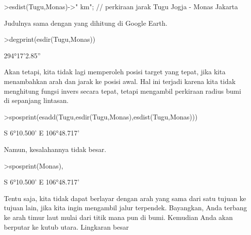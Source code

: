 \documentclass[a4paper,10pt]{article}
\begin{document}
\begin{eulernotebook}
\begin{eulercomment}
\begin{eulercomment}
\begin{eulercomment}
\begin{eulercomment}
\begin{eulercomment}
\begin{eulercomment}
\begin{eulercomment}
\begin{eulercomment}
\begin{eulercomment}
\begin{eulercomment}
\begin{eulercomment}
\begin{eulercomment}
\begin{eulercomment}
\begin{eulercomment}
\begin{eulercomment}
\begin{eulercomment}
\begin{eulercomment}
\begin{eulercomment}
\begin{eulercomment}
\begin{eulercomment}
\begin{eulercomment}
\begin{eulercomment}
\begin{eulercomment}
\begin{eulercomment}
\begin{eulercomment}
\begin{eulercomment}
\begin{eulercomment}
\begin{eulercomment}
\begin{eulercomment}
\begin{eulercomment}
\begin{eulerprompt}
>esdist(Tugu,Monas)->" km"; // perkiraan jarak Tugu Jogja - Monas Jakarta
\end{eulerprompt}
\begin{eulercomment}
Judulnya sama dengan yang dihitung di Google Earth.
\end{eulercomment}
\begin{eulerprompt}
>degprint(esdir(Tugu,Monas))
\end{eulerprompt}
\begin{euleroutput}
  294°17'2.85''
\end{euleroutput}
\begin{eulercomment}
Akan tetapi, kita tidak lagi memperoleh posisi target yang tepat, jika
kita menambahkan arah dan jarak ke posisi awal. Hal ini terjadi karena
kita tidak menghitung fungsi invers secara tepat, tetapi mengambil
perkiraan radius bumi di sepanjang lintasan.
\end{eulercomment}
\begin{eulerprompt}
>sposprint(esadd(Tugu,esdir(Tugu,Monas),esdist(Tugu,Monas)))
\end{eulerprompt}
\begin{euleroutput}
  S 6°10.500' E 106°48.717'
\end{euleroutput}
\begin{eulercomment}
Namun, kesalahannya tidak besar.
\end{eulercomment}
\begin{eulerprompt}
>sposprint(Monas),
\end{eulerprompt}
\begin{euleroutput}
  S 6°10.500' E 106°48.717'
\end{euleroutput}
\begin{eulercomment}
Tentu saja, kita tidak dapat berlayar dengan arah yang sama dari satu
tujuan ke tujuan lain, jika kita ingin mengambil jalur terpendek.
Bayangkan, Anda terbang ke arah timur laut mulai dari titik mana pun
di bumi. Kemudian Anda akan berputar ke kutub utara. Lingkaran besar

\end{eulercomment}
\end{eulercomment}
\end{eulercomment}
\end{eulercomment}
\end{eulercomment}
\end{eulercomment}
\end{eulercomment}
\end{eulercomment}
\end{eulercomment}
\end{eulercomment}
\end{eulercomment}
\end{eulercomment}
\end{eulercomment}
\end{eulercomment}
\end{eulercomment}
\end{eulercomment}
\end{eulercomment}
\end{eulercomment}
\end{eulercomment}
\end{eulercomment}
\end{eulercomment}
\end{eulercomment}
\end{eulercomment}
\end{eulercomment}
\end{eulercomment}
\end{eulercomment}
\end{eulercomment}
\end{eulercomment}
\end{eulercomment}
\end{eulercomment}
\end{eulercomment}
\end{eulernotebook}
\end{document}
